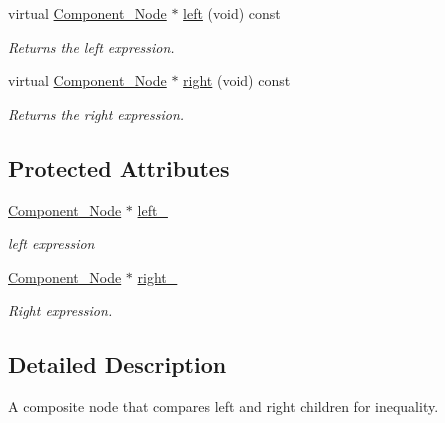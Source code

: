 \begin{DoxyCompactItemize}
virtual \hyperlink{classMadara_1_1Expression__Tree_1_1Component__Node}{Component\_\-Node} $\ast$ \hyperlink{classMadara_1_1Expression__Tree_1_1Composite__Binary__Node_a6ca5cccbc46ccc6026c18f9665298380}{left} (void) const 
\begin{DoxyCompactList}\small\item\em Returns the left expression. \item\end{DoxyCompactList}\item 
virtual \hyperlink{classMadara_1_1Expression__Tree_1_1Component__Node}{Component\_\-Node} $\ast$ \hyperlink{classMadara_1_1Expression__Tree_1_1Composite__Unary__Node_ade55cde5707e0fa73ab1c019159b9aec}{right} (void) const 
\begin{DoxyCompactList}\small\item\em Returns the right expression. \item\end{DoxyCompactList}\end{DoxyCompactItemize}
\subsection*{Protected Attributes}
\begin{DoxyCompactItemize}
\item 
\hyperlink{classMadara_1_1Expression__Tree_1_1Component__Node}{Component\_\-Node} $\ast$ \hyperlink{classMadara_1_1Expression__Tree_1_1Composite__Binary__Node_acac60a70beb2484737e6e7161edb2d1b}{left\_\-}
\begin{DoxyCompactList}\small\item\em left expression \item\end{DoxyCompactList}\item 
\hyperlink{classMadara_1_1Expression__Tree_1_1Component__Node}{Component\_\-Node} $\ast$ \hyperlink{classMadara_1_1Expression__Tree_1_1Composite__Unary__Node_a077b7bd1b52df6f5c6adfde735556a68}{right\_\-}
\begin{DoxyCompactList}\small\item\em Right expression. \item\end{DoxyCompactList}\end{DoxyCompactItemize}


\subsection{Detailed Description}
A composite node that compares left and right children for inequality. 

